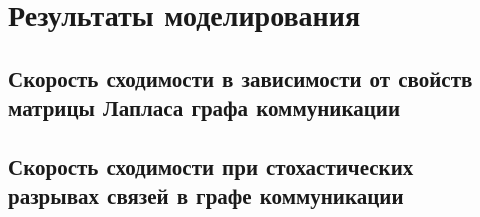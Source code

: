 \chapter{Результаты моделирования} \label{results}

\section{Скорость сходимости в зависимости от свойств матрицы Лапласа графа коммуникации}

\section{Скорость сходимости при стохастических разрывах связей в графе коммуникации}

\clearpage
